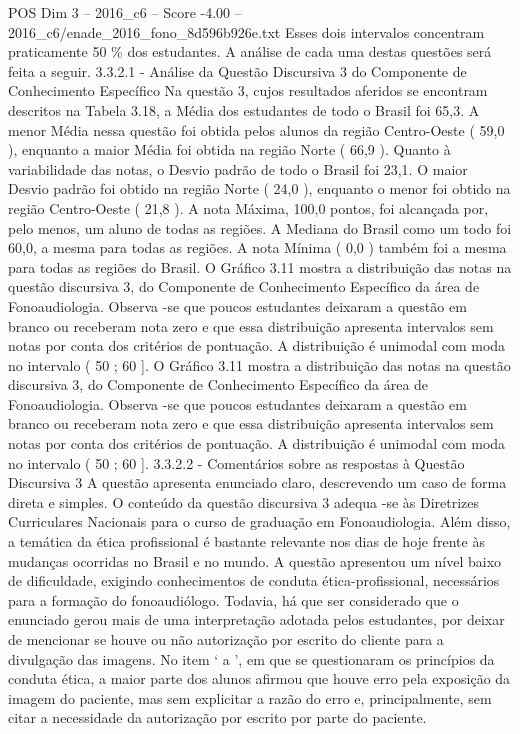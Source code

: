 \begin{textsample}{POS Dim 3 – 2016\_c6 – Score -4.00 – 2016\_c6/enade\_2016\_fono\_8d596b926e.txt}
Esses dois intervalos concentram praticamente 50 \% dos estudantes.
A análise de cada uma destas questões será feita a seguir. 3.3.2.1 - Análise da Questão Discursiva 3 do Componente de Conhecimento Específico Na questão 3, cujos resultados aferidos se encontram descritos na Tabela 3.18, a Média dos estudantes de todo o Brasil foi 65,3.
A menor Média nessa questão foi obtida pelos alunos da região Centro-Oeste ( 59,0 ), enquanto a maior Média foi obtida na região Norte ( 66,9 ).
Quanto à variabilidade das notas, o Desvio padrão de todo o Brasil foi 23,1.
O maior Desvio padrão foi obtido na região Norte ( 24,0 ), enquanto o menor foi obtido na região Centro-Oeste ( 21,8 ).
A nota Máxima, 100,0 pontos, foi alcançada por, pelo menos, um aluno de todas as regiões.
A Mediana do Brasil como um todo foi 60,0, a mesma para todas as regiões.
A nota Mínima ( 0,0 ) também foi a mesma para todas as regiões do Brasil.
O Gráfico 3.11 mostra a distribuição das notas na questão discursiva 3, do Componente de Conhecimento Específico da área de Fonoaudiologia.
Observa -se que poucos estudantes deixaram a questão em branco ou receberam nota zero e que essa distribuição apresenta intervalos sem notas por conta dos critérios de pontuação.
A distribuição é unimodal com moda no intervalo ( 50 ; 60 ].
O Gráfico 3.11 mostra a distribuição das notas na questão discursiva 3, do Componente de Conhecimento Específico da área de Fonoaudiologia.
Observa -se que poucos estudantes deixaram a questão em branco ou receberam nota zero e que essa distribuição apresenta intervalos sem notas por conta dos critérios de pontuação.
A distribuição é unimodal com moda no intervalo ( 50 ; 60 ]. 3.3.2.2 - Comentários sobre as respostas à Questão Discursiva 3 A questão apresenta enunciado claro, descrevendo um caso de forma direta e simples.
O conteúdo da questão discursiva 3 adequa -se às Diretrizes Curriculares Nacionais para o curso de graduação em Fonoaudiologia.
Além disso, a temática da ética profissional é bastante relevante nos dias de hoje frente às mudanças ocorridas no Brasil e no mundo.
A questão apresentou um nível baixo de dificuldade, exigindo conhecimentos de conduta ética-profissional, necessários para a formação do fonoaudiólogo.
Todavia, há que ser considerado que o enunciado gerou mais de uma interpretação adotada pelos estudantes, por deixar de mencionar se houve ou não autorização por escrito do cliente para a divulgação das imagens.
No item ‘ a ’, em que se questionaram os princípios da conduta ética, a maior parte dos alunos afirmou que houve erro pela exposição da imagem do paciente, mas sem explicitar a razão do erro e, principalmente, sem citar a necessidade da autorização por escrito por parte do paciente.

\end{textsample}
